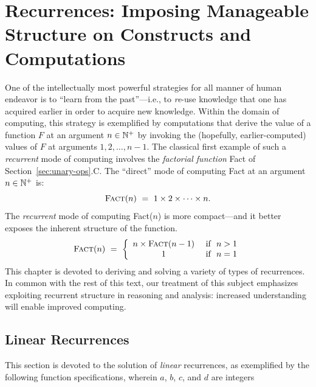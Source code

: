 
\chapter{Recurrences:
Imposing Manageable Structure on Constructs and Computations}
\label{ch:Recurrences}

One of the intellectually most powerful strategies for all manner of
human endeavor is to ``learn from the past''---i.e., to {\em re}-use
knowledge that one has acquired earlier in order to acquire new
knowledge.  Within the domain of computing, this strategy is
exemplified by computations that derive the value of a function $F$ at
an argument $n \in \mathbb{N}^+$ by invoking the (hopefully, earlier-computed)
values of $F$ at arguments $1, 2, \ldots, n-1$.  The classical first
example of such a {\it recurrent} mode of computing involves the {\it
  factorial function} {\sc Fact} of Section~\ref{sec:unary-ops}.C.
The ``direct'' mode of computing {\sc Fact} at an argument $n \in
\mathbb{N}^+$ is:
\[ \mbox{\sc Fact}(n) \ = \ 1 \times 2 \times \cdots \times n. \]
The {\em recurrent} mode of computing {\sc Fact}($n$) is more
compact---and it better exposes the inherent structure of the
function.
\[ \mbox{\sc Fact}(n) \ = \ \left\{
\begin{array}{cl}
 n \times \mbox{\sc Fact}(n-1) & \mbox{ if } \ n > 1 \\
 1 & \mbox{ if } \ n = 1 \\
\end{array}
\right.
\]
This chapter is devoted to deriving and solving a variety of types of
recurrences.  In common with the rest of this text, our treatment of
this subject emphasizes exploiting recurrent structure in reasoning
and analysis: increased understanding will enable improved computing.


\section{Linear Recurrences}
\label{sec:linear-recurrences}

This section is devoted to the solution of {\em linear} recurrences,
as exemplified by the following function specifications, wherein $a$,
$b$, $c$, and $d$ are integers


